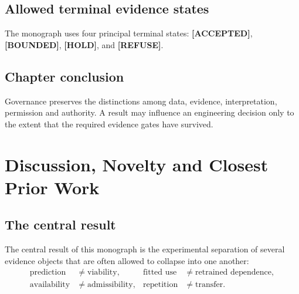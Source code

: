 \documentclass[11pt,a4paper,oneside]{report}
\providecommand{\accepted}{\textcolor{geoGreen}{\textbf{[ACCEPTED]}}}
\providecommand{\bounded}{\textcolor{geoGold}{\textbf{[BOUNDED]}}}
\providecommand{\hold}{\textcolor{geoRust}{\textbf{[HOLD]}}}
\providecommand{\refuse}{\textcolor{geoRust}{\textbf{[REFUSE]}}}
\begin{document}
\section{Allowed terminal evidence states}
The monograph uses four principal terminal states: \accepted{}, \bounded{}, \hold{}, and \refuse{}.

\section{Chapter conclusion}
Governance preserves the distinctions among data, evidence, interpretation, permission and authority. A result may influence an engineering decision only to the extent that the required evidence gates have survived.



\chapter{Discussion, Novelty and Closest Prior Work}
\label{chap:discussion}

\section{The central result}
The central result of this monograph is the experimental separation of several evidence objects that are often allowed to collapse into one another:
\begin{equation}
\begin{aligned}\text{prediction} &\neq \text{viability}, & \text{fitted use} &\neq \text{retrained dependence},\\ \text{availability} &\neq \text{admissibility}, & \text{repetition} &\neq \text{transfer}.\end{aligned}
\end{equation}
\end{document}

